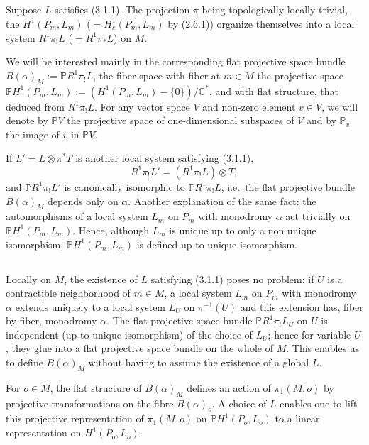 \documentclass[12pt,a4paper]{article}
\theoremstyle{plain}
\theoremstyle{definition}
\theoremstyle{remark}
\newcommand{\CC}{\mathbb{C}}
\newcommand{\PP}{\mathbb{P}}
\numberwithin{equation}{section}
\providecommand{\CC}{\mathbb{C}}
\providecommand{\PP}{\mathbb{P}}
\begin{document}
\subsection{}
Suppose $L$ satisfies (3.1.1). The projection $\pi$ being topologically locally trivial, the $H^1(P_m, L_m)$ ($= H^1_c(P_m, L_m)$ by (2.6.1)) organize themselves into a local system $R^1\pi_!L$ ($= R^1\pi_*L$) on $M$.

We will be interested mainly in the corresponding flat projective space bundle $B(\alpha)_M := \PP R^1\pi_!L$, the fiber space with fiber at $m \in M$ the projective space $\PP H^1(P_m, L_m) := (H^1(P_m, L_m) - \{0\})/\CC^*$, and with flat structure, that deduced from $R^1\pi_!L$. For any vector space $V$ and non-zero element $v \in V$, we will denote by $\PP V$ the projective space of one-dimensional subspaces of $V$ and by $\PP_v$ the image of $v$ in $\PP V$.

If $L' = L \otimes \pi^*T$ is another local system satisfying (3.1.1),
\[
R^1\pi_!L' = (R^1\pi_!L) \otimes T,
\]
and $\PP R^1\pi_!L'$ is canonically isomorphic to $\PP R^1\pi_!L$, i.e.\ the flat projective bundle $B(\alpha)_M$ depends only on $\alpha$. Another explanation of the same fact: the automorphisms of a local system $L_m$ on $P_m$ with monodromy $\alpha$ act trivially on $\PP H^1(P_m, L_m)$. Hence, although $L_m$ is unique up to only a non unique isomorphism, $\PP H^1(P_m, L_m)$ is defined up to unique isomorphism.

\subsection{}
Locally on $M$, the existence of $L$ satisfying (3.1.1) poses no problem: if $U$ is a contractible neighborhood of $m \in M$, a local system $L_m$ on $P_m$ with monodromy $\alpha$ extends uniquely to a local system $L_U$ on $\pi^{-1}(U)$ and this extension has, fiber by fiber, monodromy $\alpha$. The flat projective space bundle $\PP R^1\pi_!L_U$ on $U$ is independent (up to unique isomorphism) of the choice of $L_U$; hence for variable $U$, they glue into a flat projective space bundle on the whole of $M$. This enables us to define $B(\alpha)_M$ without having to assume the existence of a global $L$.

For $o \in M$, the flat structure of $B(\alpha)_M$ defines an action of $\pi_1(M, o)$ by projective transformations on the fibre $B(\alpha)_o$. A choice of $L$ enables one to lift this projective representation of $\pi_1(M, o)$ on $\PP H^1(P_o, L_o)$ to a linear representation on $H^1(P_o, L_o)$.
\end{document}
